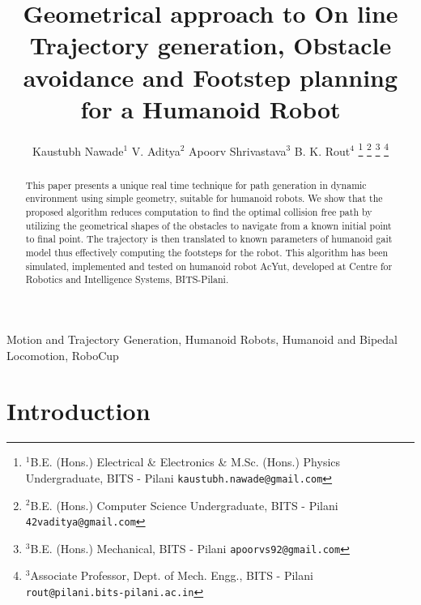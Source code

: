 \documentclass[letterpaper, 10 pt, conference]{ieeeconf}  %
\title{\LARGE \bf
Geometrical approach to On line Trajectory generation, Obstacle avoidance and Footstep planning for a Humanoid Robot
}
\author{ Kaustubh Nawade$^{1}$ V. Aditya$^{2}$ Apoorv Shrivastava$^{3}$ B. K. Rout$^{4}$%
\thanks{$^{1}$B.E. (Hons.) Electrical \& Electronics \& M.Sc. (Hons.) Physics Undergraduate, BITS - Pilani
        {\tt\small kaustubh.nawade@gmail.com}}%
\thanks{$^{2}$B.E. (Hons.) Computer Science Undergraduate, BITS - Pilani
        {\tt\small 42vaditya@gmail.com}}%
\thanks{$^{3}$B.E. (Hons.) Mechanical, BITS - Pilani
        {\tt\small apoorvs92@gmail.com}}%
\thanks{$^{3}$Associate Professor, Dept. of Mech. Engg., BITS - Pilani
        {\tt\small rout@pilani.bits-pilani.ac.in}}%
}
\begin{document}
\maketitle
\thispagestyle{empty}
\pagestyle{empty}


\begin{abstract}

This paper presents a unique real time technique for   path generation in dynamic environment using simple geometry, suitable for humanoid robots. We show that the proposed algorithm reduces computation to find the optimal collision free path by utilizing the geometrical shapes of the obstacles  to navigate from a known initial point to final point. The trajectory is then translated to known parameters of humanoid gait model thus effectively computing the footsteps for the robot. This algorithm has been simulated, implemented and tested on humanoid robot AcYut, developed at Centre for Robotics and Intelligence Systems, BITS-Pilani.\\
\end{abstract}

\begin{keywords}
Motion and Trajectory Generation, Humanoid Robots, Humanoid and Bipedal Locomotion, RoboCup
\end{keywords}


\section{Introduction}
\end{document}
